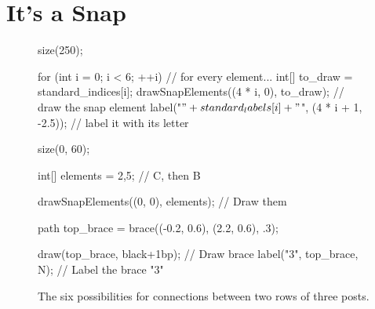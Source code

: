 \documentclass[../gatm.tex]{subfiles}
\begin{document}
\section{It's a Snap}

\newcommand\snap{\bullet} %

\begin{figure}[h]
	\begin{center}
		\begin{minipage}[b]{\textwidth}
			\centering
			\begin{asy}[width=0.5\textwidth]
				size(250);
	
				for (int i = 0; i < 6; ++i) { // for every element...
					int[] to_draw = {standard_indices[i]};
					drawSnapElements((4 * i, 0), to_draw); // draw the snap element
					label("$" + standard_labels[i] + "$", (4 * i + 1, -2.5)); // label it with its letter
				}
			\end{asy}
		\end{minipage}
	\end{center}
	\vspace*{-2\baselineskip}
	\begin{center}
		\begin{minipage}[t]{\textwidth}
			\caption{The six possibilities for connections between two rows of three posts.}
			\label{fig:all_3_cols}
		\end{minipage}
	\end{center}

	\begin{center}
		\begin{minipage}[b]{0.45\textwidth}
			\centering
			\begin{asy}[width=0.3\textwidth]
				size(0, 60);
	
				int[] elements = {2,5}; // C, then B
	
				drawSnapElements((0, 0), elements); // Draw them
	
				path top_brace = brace((-0.2, 0.6), (2.2, 0.6), .3);
	
				draw(top_brace, black+1bp); // Draw brace
				label("$3$", top_brace, N); // Label the brace "3"
	

\end{asy}
\end{minipage}
\end{center}
\end{figure}
\end{document}
